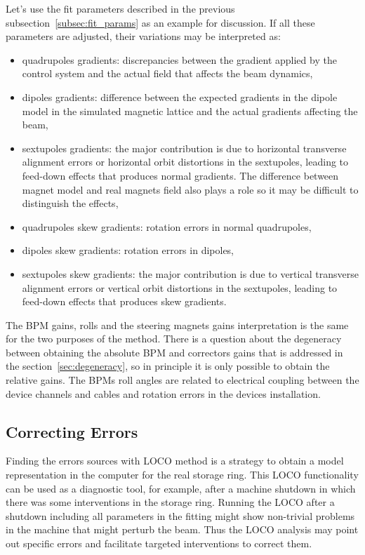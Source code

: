 Let's use the fit parameters described in the previous subsection~\ref{subsec:fit_params} as an example for discussion. If all these parameters are adjusted, their variations may be interpreted as:
\begin{itemize}
    \item quadrupoles gradients: discrepancies between the gradient applied by the control system and the actual field that affects the beam dynamics,
    \item dipoles gradients: difference between the expected gradients in the dipole model in the simulated magnetic lattice and the actual gradients affecting the beam,
    \item sextupoles gradients: the major contribution is due to horizontal transverse alignment errors or horizontal orbit distortions in the sextupoles, leading to feed-down effects that produces normal gradients. The difference between magnet model and real magnets field also plays a role so it may be difficult to distinguish the effects, 
    \item quadrupoles skew gradients: rotation errors in normal quadrupoles,
    \item dipoles skew gradients: rotation errors in dipoles,
    \item sextupoles skew gradients: the major contribution is due to vertical transverse alignment errors or vertical orbit distortions in the sextupoles, leading to feed-down effects that produces skew gradients. 
    \end{itemize}
The BPM gains, rolls and the steering magnets gains interpretation is the same for the two purposes of the method. There is a question about the degeneracy between obtaining the absolute BPM and correctors gains that is addressed in the section~\ref{sec:degeneracy}, so in principle it is only possible to obtain the relative gains. The BPMs roll angles are related to electrical coupling between the device channels and cables and rotation errors in the devices installation.
\subsection{Correcting Errors}
Finding the errors sources with LOCO method is a strategy to obtain a model representation in the computer for the real storage ring. This LOCO functionality can be used as a diagnostic tool, for example, after a machine shutdown in which there was some interventions in the storage ring. Running the LOCO after a shutdown including all parameters in the fitting might show non-trivial problems in the machine that might perturb the beam. Thus the LOCO analysis may point out specific errors and facilitate targeted interventions to correct them.

